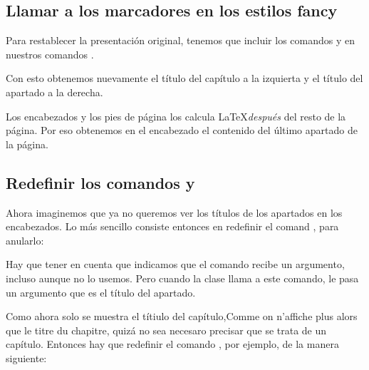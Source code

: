 \subsection{Llamar a los marcadores en los estilos fancy}

Para restablecer la presentación original, tenemos que incluir los comandos  y  en nuestros comandos .

\begin{latexcode}
\fancyhead[LE,RO]{}
\fancyhead[RE]{\leftmark}
\fancyhead[LO]{\rightmark}
\end{latexcode}

Con esto obtenemos nuevamente el título del capítulo a la izquierta y el título del apartado a la derecha.

\begin{attention}
Los encabezados y los pies de página los calcula  \LaTeX \emph{después} del resto de la página. Por eso obtenemos en el encabezado el contenido del último apartado de la página.
\end{attention}

\subsection[Redefinir \oldcs{chaptermark} y \oldcs{sectionmark}]{Redefinir los comandos  y }

Ahora imaginemos que ya no queremos ver los títulos de los apartados en los encabezados. Lo más sencillo consiste entonces en redefinir el comand , para anularlo:

\begin{latexcode}
\renewcommand{\sectionmark}[1]{}
\end{latexcode}

\begin{attention}
Hay que tener en cuenta que indicamos que el comando  recibe un argumento, incluso aunque no lo usemos. Pero cuando la clase  llama a este comando, le pasa un argumento que es el título del apartado.
\end{attention}

Como ahora solo se muestra el títiulo del capítulo,Comme  on n'affiche  plus  alors que le titre du chapitre, quizá no sea necesaro precisar que se trata de un capítulo. Entonces hay que redefinir el comando , por ejemplo, de la manera siguiente:

\begin{latexcode}
\renewcommand{\chaptermark}[1]{\markboth {\MakeUppercase{%
    \thechapter~#1}}{}}
\end{latexcode}


